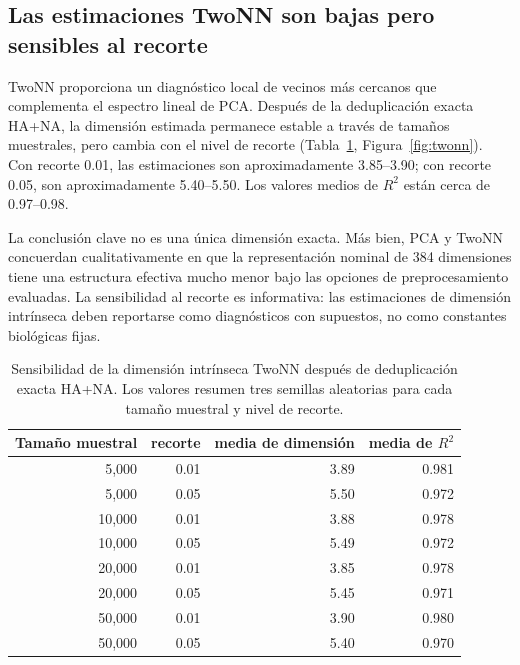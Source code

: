 \documentclass[11pt]{article}
\begin{document}
\subsection{Las estimaciones TwoNN son bajas pero sensibles al recorte}

TwoNN proporciona un diagnóstico local de vecinos más cercanos que complementa el espectro lineal de PCA. Después de la deduplicación exacta HA+NA, la dimensión estimada permanece estable a través de tamaños muestrales, pero cambia con el nivel de recorte (Tabla~\ref{tab:twonn}, Figura~\ref{fig:twonn}). Con recorte 0.01, las estimaciones son aproximadamente 3.85--3.90; con recorte 0.05, son aproximadamente 5.40--5.50. Los valores medios de $R^2$ están cerca de 0.97--0.98.

La conclusión clave no es una única dimensión exacta. Más bien, PCA y TwoNN concuerdan cualitativamente en que la representación nominal de 384 dimensiones tiene una estructura efectiva mucho menor bajo las opciones de preprocesamiento evaluadas. La sensibilidad al recorte es informativa: las estimaciones de dimensión intrínseca deben reportarse como diagnósticos con supuestos, no como constantes biológicas fijas.

\begin{table}[H]
\centering
\caption{Sensibilidad de la dimensión intrínseca TwoNN después de deduplicación exacta HA+NA. Los valores resumen tres semillas aleatorias para cada tamaño muestral y nivel de recorte.}
\label{tab:twonn}
\begin{tabular}{rrrr}
\toprule
Tamaño muestral & recorte & media de dimensión & media de $R^2$ \\
\midrule
5,000 & 0.01 & 3.89 & 0.981 \\
5,000 & 0.05 & 5.50 & 0.972 \\
10,000 & 0.01 & 3.88 & 0.978 \\
10,000 & 0.05 & 5.49 & 0.972 \\
20,000 & 0.01 & 3.85 & 0.978 \\
20,000 & 0.05 & 5.45 & 0.971 \\
50,000 & 0.01 & 3.90 & 0.980 \\
50,000 & 0.05 & 5.40 & 0.970 \\
\bottomrule
\end{tabular}
\end{table}
\end{document}
